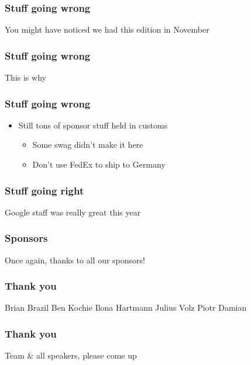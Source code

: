 \documentclass[t]{beamer}
\begin{document}
\begin{frame}
	\frametitle{Stuff going wrong}
	\centering
	\vfill
	You might have noticed we had this edition in November
	\vfill
\end{frame}

\begin{frame}
	\frametitle{Stuff going wrong}
	\centering
	\vfill
	This is why
	\vfill
\end{frame}

\begin{frame}
	\frametitle{Stuff going wrong}
	\vfill
	\begin{itemize}
		\item Still tons of sponsor stuff held in customs
		\begin{itemize}
			\item Some swag didn't make it here
			\item Don't use FedEx to ship to Germany
		\end{itemize}
	\end{itemize}
	\vfill
\end{frame}

\begin{frame}
	\frametitle{Stuff going right}
	\centering
	\vfill
	Google staff was really great this year
	\vfill
\end{frame}

\begin{frame}
	\frametitle{Sponsors}
	\begin{center}
	\vfill
	Once again, thanks to all our sponsors!
	\vfill
	\end{center}
\end{frame}

\begin{frame}
	\frametitle{Thank you}
	\begin{center}
	\vfill
	Brian Brazil
	\vfill
	Ben Kochie
	\vfill
	Ilona Hartmann
	\vfill
	Julius Volz
	\vfill
	Piotr Damian
	\vfill
	\end{center}
\end{frame}

\begin{frame}
	\frametitle{Thank you}
	\begin{center}
	\vfill
	Team \& all speakers, please come up
	\vfill
	\end{center}
\end{frame}

\end{document}
